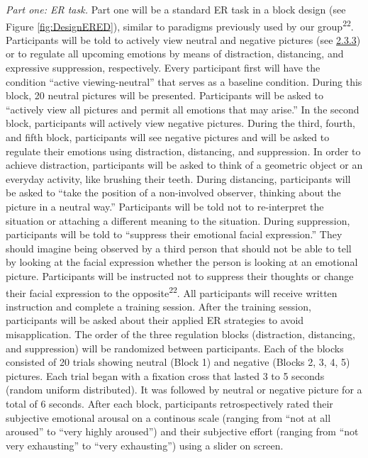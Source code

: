 \documentclass[
  english,
  man,floatsintext]{apa6}
\begin{document}
\emph{Part one: ER task.} Part one will be a standard ER task in a block design (see Figure \ref{fig:DesignERED}), similar to paradigms previously used by our group\textsuperscript{22}.
Participants will be told to actively view neutral and negative pictures (see \protect\hyperlink{ux5cux23stimuli}{2.3.3}) or to regulate all upcoming emotions by means of distraction, distancing, and expressive suppression, respectively.
Every participant first will have the condition ``active viewing-neutral'' that serves as a baseline condition.
During this block, 20 neutral pictures will be presented.
Participants will be asked to ``actively view all pictures and permit all emotions that may arise.''
In the second block, participants will actively view negative pictures.
During the third, fourth, and fifth block, participants will see negative pictures and will be asked to regulate their emotions using distraction, distancing, and suppression.
In order to achieve distraction, participants will be asked to think of a geometric object or an everyday activity, like brushing their teeth.
During distancing, participants will be asked to ``take the position of a non-involved observer, thinking about the picture in a neutral way.''
Participants will be told not to re-interpret the situation or attaching a different meaning to the situation.
During suppression, participants will be told to ``suppress their emotional facial expression.''
They should imagine being observed by a third person that should not be able to tell by looking at the facial expression whether the person is looking at an emotional picture.
Participants will be instructed not to suppress their thoughts or change their facial expression to the opposite\textsuperscript{22}.
All participants will receive written instruction and complete a training session.
After the training session, participants will be asked about their applied ER strategies to avoid misapplication.
The order of the three regulation blocks (distraction, distancing, and suppression) will be randomized between participants.
Each of the blocks consisted of 20 trials showing neutral (Block 1) and negative (Blocks 2, 3, 4, 5) pictures.
Each trial began with a fixation cross that lasted 3 to 5 seconds (random uniform distributed).
It was followed by neutral or negative picture for a total of 6 seconds.
After each block, participants retrospectively rated their subjective emotional arousal on a continous scale (ranging from ``not at all aroused'' to ``very highly aroused'') and their subjective effort (ranging from ``not very exhausting'' to ``very exhausting'') using a slider on screen.
\end{document}
